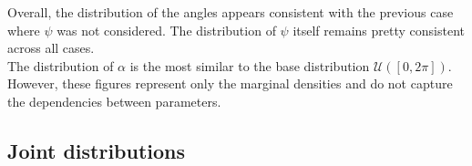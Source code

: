 \documentclass[a4paper,12pt]{article}
\theoremstyle{definition}
\begin{document}
Overall, the distribution of the angles appears consistent with the previous case where \(\psi\) was not considered. The distribution of \(\psi\) itself remains pretty consistent across all cases.\\
The distribution of $\alpha$ is the most similar to the base distribution $\mathcal{U}([0,2\pi])$.\\
However, these figures represent only the marginal densities and do not capture the dependencies between parameters.

\subsection{Joint distributions}

\begin{figure}[htbp]
    \centering


\end{figure}
\end{document}
